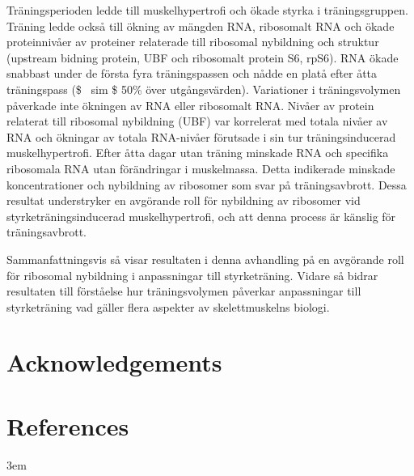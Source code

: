 \documentclass[twoside,10pt]{gihclass} %
\begin{document}
Träningsperioden ledde till muskelhypertrofi och ökade styrka i träningsgruppen. Träning ledde också till ökning av mängden RNA, ribosomalt RNA och ökade proteinnivåer av proteiner relaterade till ribosomal nybildning och struktur (upstream bidning protein, UBF och ribosomalt protein S6, rpS6).
RNA ökade snabbast under de första fyra träningspassen och nådde en platå efter åtta träningspass (\$ ~sim \$ 50\% över utgångsvärden). Variationer i träningsvolymen påverkade inte ökningen av RNA eller ribosomalt RNA.
Nivåer av protein relaterat till ribosomal nybildning (UBF) var korrelerat med totala nivåer av RNA och ökningar av totala RNA-nivåer förutsade i sin tur träningsinducerad muskelhypertrofi. Efter åtta dagar utan träning minskade RNA och specifika ribosomala RNA utan förändringar i muskelmassa. Detta indikerade minskade koncentrationer och nybildning av ribosomer som svar på träningsavbrott. Dessa resultat understryker en avgörande roll för nybildning av ribosomer vid styrketräningsinducerad muskelhypertrofi, och att denna process är känslig för träningsavbrott.

Sammanfattningsvis så visar resultaten i denna avhandling på en avgörande roll för ribosomal nybildning i anpassningar till styrketräning. Vidare så bidrar resultaten till förståelse hur träningsvolymen påverkar anpassningar till styrketräning vad gäller flera aspekter av skelettmuskelns biologi.

\hypertarget{acknowledgements}{%
\chapter{Acknowledgements}\label{acknowledgements}}

\backmatter

\hypertarget{references}{%
\chapter*{References}\label{references}}


\noindent

\setlength{\parskip}{4pt}

\rightskip3em

\footnotesize
\end{document}
